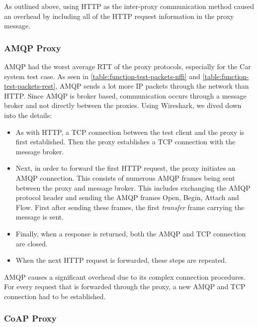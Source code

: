 As outlined above, using HTTP as the inter-proxy communication method caused an
overhead by including all of the HTTP request information in the proxy message.

\subsubsection{AMQP Proxy}

AMQP had the worst average RTT of the proxy protocols, especially for the Car
system test case. As seen in \cref{table:function-test-packets-nffi} and
\cref{table:function-test-packets-rest}, AMQP sends a lot more IP packets
through the network than HTTP. Since AMQP is broker based, communication occurs
through a message broker and not directly between the proxies. Using Wireshark,
we dived down into the details:

\begin{itemize}

	\item As with HTTP, a TCP connection between the test client and the
	proxy is first established. Then the proxy establishes a TCP connection with the
	message broker.

	 \item Next, in order to forward the first HTTP request, the proxy initiates
	 an AMQP connection. This consists of numerous AMQP frames being sent between
	 the proxy and message broker. This includes exchanging the AMQP protocol
	 header and sending the AMQP frames Open, Begin, Attach and Flow.  First after
	 sending these frames, the first \textit{transfer} frame carrying the
	 message is sent.

     \item Finally, when a response is returned, both the AMQP and TCP connection
     are closed.

     \item When the next HTTP request is forwarded, these steps are repeated.

\end{itemize}

AMQP causes a significant overhead due to its complex connection procedures. For
every request that is forwarded through the proxy, a new AMQP and TCP connection
had to be established.

\subsubsection{CoAP Proxy}

